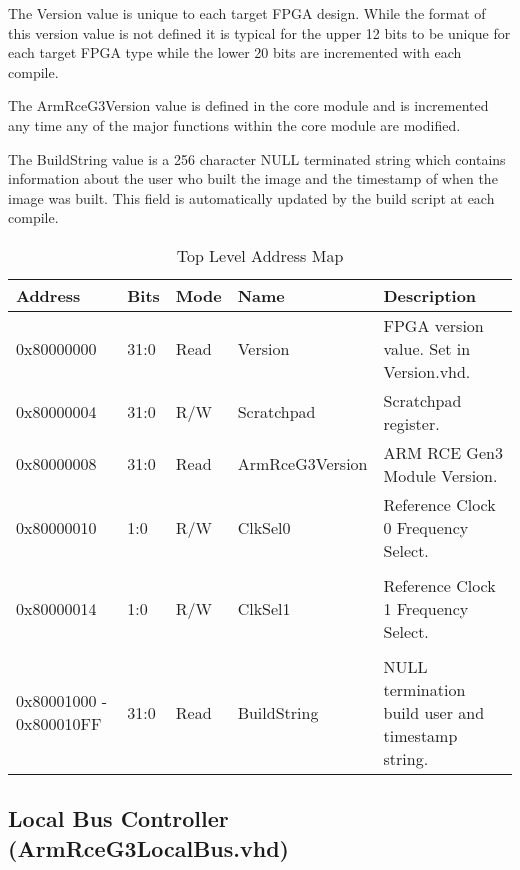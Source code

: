 \documentclass[11pt]{article}
\begin{document}
The Version value is unique to each target FPGA design. While the format of this version value is not defined it is typical for the upper 
12 bits to be unique for each target FPGA type while the lower 20 bits are incremented with each compile.

The ArmRceG3Version value is defined in the core module and is incremented any time any of the major functions within the core module are
modified.

The BuildString value is a 256 character NULL terminated string which contains information about the user who built the image and the 
timestamp of when the image was built. This field is automatically updated by the build script at each compile.

\begin{table}[H]
\small
\centering
   \begin{tabular}{| l | l | l | l | l | } 
      \hline \textbf{Address} & \textbf{Bits} & \textbf{Mode} & \textbf{Name} & \textbf{Description} \\
      \hline 0x80000000       & 31:0          & Read     & Version         & FPGA version value. Set in Version.vhd. \\
      \hline 0x80000004       & 31:0          & R/W      & Scratchpad      & Scratchpad register.                                 \\
      \hline 0x80000008       & 31:0          & Read     & ArmRceG3Version & ARM RCE Gen3 Module Version.                         \\
      \hline 0x80000010       & 1:0           & R/W      & ClkSel0         & Reference Clock 0 Frequency Select. \\               \\
      \hline 0x80000014       & 1:0           & R/W      & ClkSel1         & Reference Clock 1 Frequency Select. \\               \\
      \hline 0x80001000 - 0x800010FF & 31:0   & Read     & BuildString     & NULL termination build user and timestamp string.    \\
      \hline
   \end{tabular}
   \caption{Top Level Address Map}
   \label{tab:top_addr}
\end{table}

\subsection{Local Bus Controller (ArmRceG3LocalBus.vhd)}
\label{subsec:ArmRceG3LocalBus}
\end{document}
